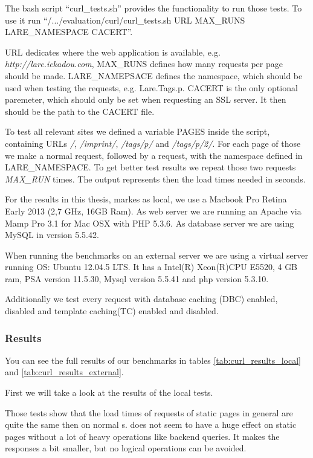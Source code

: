 The bash script \enquote{curl\_tests.sh} provides the functionality to run those \curl{} tests.
To use it run 
\enquote{/.../evaluation/curl/curl\_tests.sh URL MAX\_RUNS LARE\_NAMESPACE CACERT}.

URL dedicates where the web application is available, e.g. \emph{http://lare.iekadou.com}, MAX\_RUNS defines how many \curl{} requests per page should be made.
LARE\_NAMEPSACE defines the namespace, which should be used when testing the \lare{} requests, e.g. Lare.Tags.p.
CACERT is the only optional paremeter, which should only be set when requesting an SSL server. It then should be the path to the CACERT file.


To test all relevant sites we defined a variable PAGES inside the script, containing URLs \emph{/}, \emph{/imprint/}, \emph{/tags/p/} and \emph{/tags/p/2/}.
For each page of those we make a normal request, followed by a \lare{} request, with the namespace defined in LARE\_NAMESPACE. 
To get better test results we repeat those two requests \emph{MAX\_RUN} times. The output represents then the load times needed in seconds.

For the results in this thesis, markes as local, we use a Macbook Pro Retina Early 2013 (2,7 GHz, 16GB Ram).
As web server we are running an Apache via Mamp Pro 3.1 for Mac OSX with PHP 5.3.6.
As database server we are using MySQL in version 5.5.42.

When running the benchmarks on an external server we are using a virtual server running OS: Ubuntu 12.04.5 LTS.
It has a Intel(R) Xeon(R)CPU E5520, 4 GB ram, PSA version 11.5.30, Mysql version 5.5.41 and php version 5.3.10.

Additionally we test every request with database caching (DBC) enabled, disabled and template caching(TC) enabled and disabled.

\subsubsection{Results}

You can see the full results of our benchmarks in tables \ref{tab:curl_results_local} and \ref{tab:curl_results_external}.

First we will take a look at the results of the local tests.

Those tests show that the load times of \lare{} requests of static pages in general are quite the same then on normal \httpRequest{}s.
\lare{} does not seem to have a huge effect on static pages without a lot of heavy operations like backend queries. It makes the responses a bit smaller, but no logical operations can be avoided.

